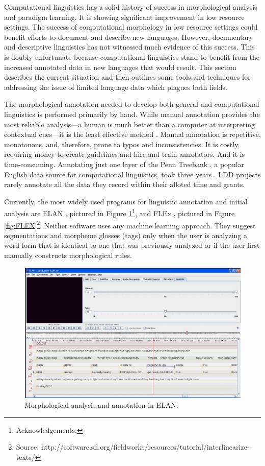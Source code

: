 \documentclass[12pt]{article}
\begin{document}
Computational linguistics has a solid history of success in morphological analysis and paradigm learning. It is showing significant improvement in low resource settings. The success of computational morphology in low resource settings could benefit efforts to document and describe new languages. However, documentary and descriptive linguistics has not witnessed much evidence of this success. This is doubly unfortunate because computational linguistics stand to benefit from the increased annotated data in new languages that would result. This section describes the current situation and then outlines some tools and techniques for addressing the issue of limited language data which plagues both fields.

The morphological annotation needed to develop both general and computational linguistics is performed primarily by hand. While manual annotation provides the most reliable analysis---a human is much better than a computer at interpreting contextual cues---it is the least effective method \cite{Baldridge06,baldridge_how_2009,palmer_semi-automated_2009}. Manual annotation is repetitive, monotonous, and, therefore, prone to typos and inconsistencies. It is costly, requiring money to create guidelines and hire and train annotators. And it is time-consuming. Annotating just one layer of the Penn Treebank \cite{taylor_penn_2003}, a popular English data source for computational linguistics, took three years \cite{duong_natural_2017,he_human---loop_2016}. LDD projects rarely annotate all the data they record within their alloted time and grants. 

Currently, the most widely used programs for linguistic annotation and initial analysis are ELAN \cite{auer_elan_2010}, pictured in Figure \ref{fig:ELAN}\footnote{Acknowledgements: }, and FLEx \cite{Black06FLEX}, pictured in Figure \ref{fig:FLEX}\footnote{Source: http://software.sil.org/fieldworks/resources/tutorial/interlinearize-texts/}. Neither software uses any machine learning approach. They suggest segmentations and morpheme glosses (tags) only when the user is analyzing a word form that is identical to one that was previously analyzed or if the user first manually constructs morphological rules. 

\begin{figure}[ht]
\label{fig:ELAN}
\begin{center}
\includegraphics[width=0.75\columnwidth]{ELAN.PNG}
\caption{Morphological analysis and annotation in ELAN.}
\end{center}
\end{figure}
\end{document}

